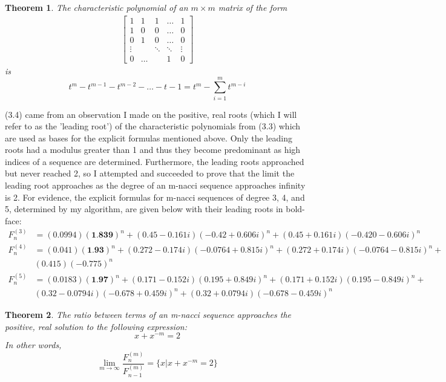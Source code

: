 \documentclass{article}
\newtheorem{theorem}{Theorem}[section]
\begin{document}
\begin{theorem}
    The characteristic polynomial of an $m\times m$ matrix of the form 
    \begin{align*}
    \begin{bmatrix} 
        1 & 1 & 1 & \dots & 1 \\
        1 & 0 & 0 & \dots & 0 \\
        0 & 1 & 0 & \dots & 0 \\
        \vdots & & \ddots & \ddots  & \vdots \\ 
        0 & \dots & & 1 & 0
    \end{bmatrix}
    \end{align*}
    is 
    $$t^m-t^{m-1}-t^{m-2}-\dots-t-1=t^m-\sum_{i=1}^m t^{m-i}$$
\end{theorem}

(3.4) came from an observation I made on the positive, real roots (which I will refer to as the 'leading root') of the characteristic polynomials from (3.3) which are used as bases for the explicit formulas mentioned above. Only the leading roots had a modulus greater than 1 and thus they become predominant as high indices of a sequence are determined. Furthermore, the leading roots approached but never reached 2, so I attempted and succeeded to prove that the limit the leading root approaches as the degree of an m-nacci sequence approaches infinity is 2.
For evidence, the explicit formulas for m-nacci sequences of degree 3, 4, and 5, determined by my algorithm, are given below with their leading roots in bold-face:
\begin{align*}
    F^{(3)}_n &= (0.0994)(\textbf{1.839})^n + (0.45 - 0.161i)(-0.42 + 0.606i)^n + (0.45 + 0.161i)(-0.420 - 0.606i)^n \\
    F^{(4)}_n &= (0.041)(\textbf{1.93})^n + (0.272 - 0.174i)(-0.0764 + 0.815i)^n + (0.272 + 0.174i)(-0.0764 - 0.815i)^n + \\ & (0.415)(-0.775)^n \\
    F^{(5)}_n &= (0.0183)(\textbf{1.97})^n + (0.171 - 0.152i)(0.195 + 0.849i)^n + (0.171 + 0.152i)(0.195 - 0.849i)^n + \\ & (0.32 - 0.0794i)(-0.678 + 0.459i)^n + (0.32 + 0.0794i)(-0.678 - 0.459i)^n
\end{align*}

\begin{theorem}
    The ratio between terms of an m-nacci sequence approaches the positive, real solution to the following expression:
    $$x+x^{-m}=2$$
    In other words, 
    $$\lim_{m \to \infty} \frac{F^{(m)}_n}{F^{(m)}_{n-1}}=\{x|x+x^{-m}=2\}$$
\end{theorem}
\end{document}
